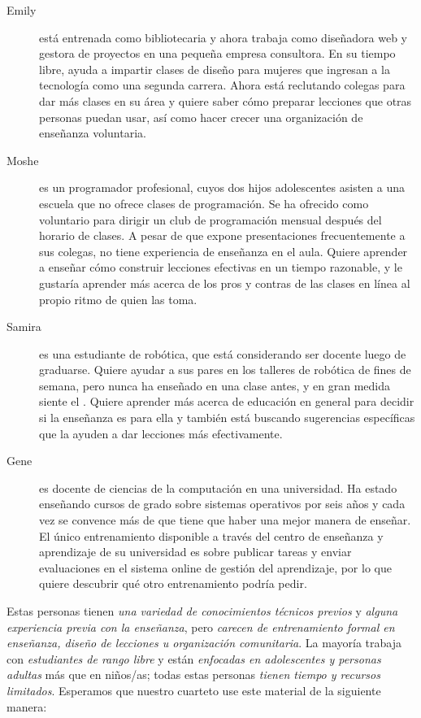 \begin{description}

\item[Emily]
está entrenada como bibliotecaria
y ahora trabaja como diseñadora web y gestora de proyectos en una pequeña empresa consultora.
En su tiempo libre, ayuda a impartir clases de diseño para mujeres que ingresan a la tecnología como una segunda carrera.
Ahora está reclutando colegas para dar más clases en su área
y quiere saber cómo preparar lecciones que otras personas puedan usar,
así como hacer crecer una organización de enseñanza voluntaria.

\item[Moshe]
es un programador profesional, cuyos dos hijos adolescentes
asisten a una escuela que no ofrece clases de programación.
Se ha ofrecido como voluntario para dirigir un club de programación mensual después del horario de clases.
A pesar de que expone presentaciones frecuentemente a sus colegas,
no tiene experiencia de enseñanza en el aula.
Quiere aprender a enseñar cómo construir lecciones efectivas en un tiempo razonable,
y le gustaría aprender más acerca de los pros y contras de las clases en línea al propio ritmo de quien las toma.

\item[Samira]
es una estudiante de robótica, que está considerando ser docente luego de graduarse.
Quiere ayudar a sus pares en los talleres de robótica de fines de semana,
pero nunca ha enseñado en una clase antes,
y en gran medida siente el .
Quiere aprender más acerca de educación en general para decidir si la enseñanza es para ella
y también está buscando sugerencias específicas que la ayuden a dar lecciones más efectivamente. 

\item[Gene]
es docente de ciencias de la computación en una universidad.
Ha estado enseñando cursos de grado sobre sistemas operativos por seis años
y cada vez se convence más de que tiene que haber una mejor manera de enseñar.
El único entrenamiento disponible a través del centro de enseñanza y aprendizaje de su universidad 
es sobre publicar tareas y enviar evaluaciones en el sistema online de gestión del aprendizaje,
por lo que quiere descubrir qué otro entrenamiento podría pedir.

\end{description}
Estas personas tienen \emph{una variedad de conocimientos técnicos previos}
y \emph{alguna experiencia previa con la enseñanza},
pero \emph{carecen de entrenamiento formal en enseñanza, diseño de lecciones u organización comunitaria}.
La mayoría trabaja con \emph{estudiantes de rango libre}
y están \emph{enfocadas en adolescentes y personas adultas}
más que en niños/as;
todas estas personas \emph{tienen tiempo y recursos limitados}.
Esperamos que nuestro cuarteto use este material de la siguiente manera:

